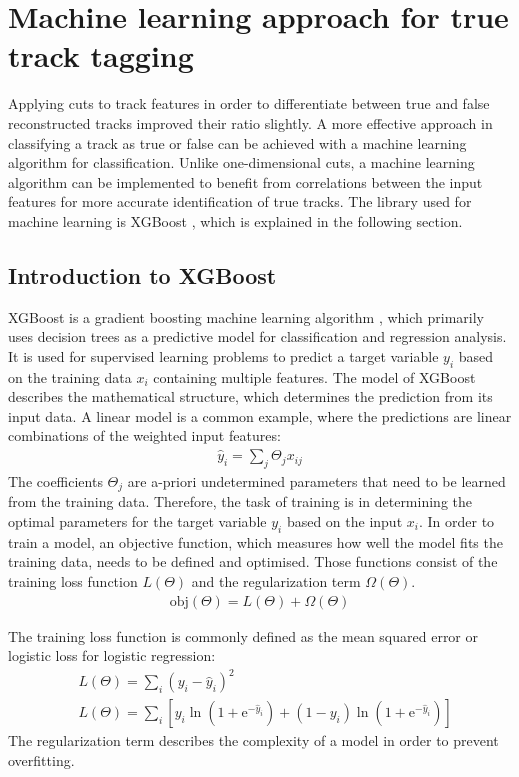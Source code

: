 \chapter{Machine learning approach for true track tagging}
Applying cuts to track features in order to differentiate between true and false reconstructed tracks improved their ratio slightly. A more effective
approach in classifying a track as true or false can be achieved with a machine learning algorithm for classification. Unlike one-dimensional cuts, a machine learning
algorithm can be implemented to benefit from correlations between the input features for more accurate identification of true tracks. The library used for
machine learning is XGBoost \cite{xgboost}, which is explained in the following section.

\section{Introduction to XGBoost}
XGBoost is a gradient boosting machine learning algorithm \cite{gradient}, which primarily uses decision trees as a predictive model for classification and regression analysis.
It is used for supervised learning problems to predict a target variable $y_i$ based on the training data $x_i$ containing multiple features. The model
of XGBoost describes the mathematical structure, which determines the prediction from its input data. A linear model is a common example, where the predictions
are linear combinations of the weighted input features:
\begin{align}
  \hat{y}_i = \sum_j \Theta_j x_{ij}
\end{align}
The coefficients $\Theta_j$ are a-priori undetermined parameters that need to be learned from the training data.
Therefore, the task of training is in determining the optimal parameters
for the target variable $y_i$ based on the input $x_i$. In order to train a model, an objective function, which measures how well
the model fits the training data, needs to be defined and optimised.
Those functions consist of the training loss function $L(\Theta) $ and the regularization term $\Omega (\Theta)$.
\begin{align}
  \text{obj}(\Theta) = L(\Theta) + \Omega(\Theta)
\end{align}

The training loss function is commonly defined as the mean squared error or logistic loss for logistic regression:
\begin{align}
  &L(\Theta) = \sum_i (y_i - \hat{y}_i)^2 \\
  &L(\Theta) = \sum_i [y_i \ln{(1 + \text{e}^{-\hat{y}_i})} + (1 - y_i) \ln{(1 + \text{e}^{-\hat{y}_i})}]
\end{align}
The regularization term describes the complexity of a model in order to prevent overfitting.

